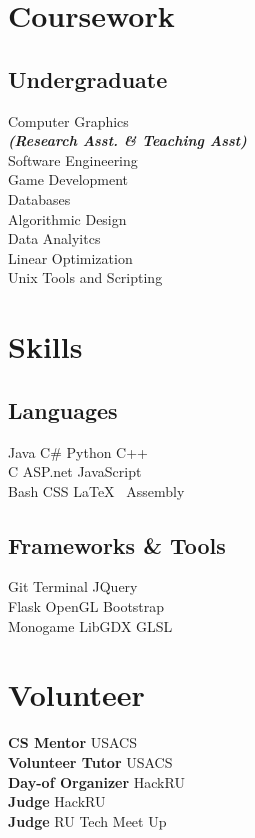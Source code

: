 \documentclass[]{deedy-resume-openfont}
\begin{document}
\begin{minipage}[t]{0.33\textwidth}
\section{Coursework}
\subsection{Undergraduate}
Computer Graphics \\
{\footnotesize \textit{\textbf{(Research Asst. \& Teaching Asst) }}} \\
Software Engineering \\
Game Development \\
Databases \\
Algorithmic Design \\
Data Analyitcs \\
Linear Optimization \\  
Unix Tools and Scripting \\
\sectionsep


\section{Skills}
\subsection{Languages}
Java \textbullet{} C\# \textbullet{} Python \textbullet{} C++ \\
C\textbullet{} ASP.net \textbullet{} JavaScript \\ 
Bash\textbullet{} CSS \textbullet{} \LaTeX\ \textbullet{} Assembly \\
\sectionsep
\subsection{Frameworks \& Tools}
Git \textbullet{}  Terminal \textbullet{} JQuery\\
Flask\textbullet{} OpenGL\textbullet{} Bootstrap \\ 
Monogame \textbullet{} LibGDX \textbullet{} GLSL
\sectionsep


\section{Volunteer}
\textbf{CS Mentor}  \textbullet{} USACS \\ 
\textbf{Volunteer Tutor} \textbullet{} USACS \\ 
\textbf{Day-of Organizer} \textbullet{} HackRU \\
\textbf{Judge} \textbullet{} HackRU \\
\textbf{Judge} \textbullet{} RU Tech Meet Up \\


\end{minipage}
\end{document}
